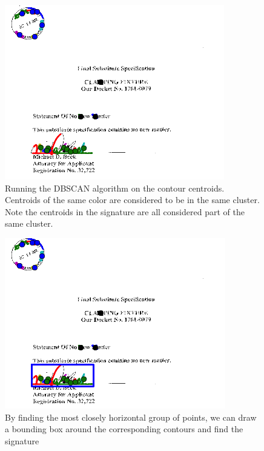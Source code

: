 \documentclass[12pt]{article}
\begin{document}
\begin{figure}
\center
\includegraphics{figs/contour-dbscan}
\caption{Running the DBSCAN algorithm on the contour centroids. Centroids of the same color are considered to be in the same cluster. Note the centroids in the signature are all considered part of the same cluster.}
\end{figure}

\begin{figure}
\center
\includegraphics{figs/boundingbox}
\caption{By finding the most closely horizontal group of points, we can draw a bounding box around the corresponding contours and find the signature}
\end{figure}

%
%
\end{document}
